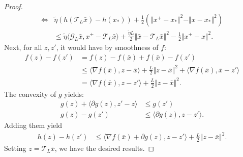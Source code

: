 \documentclass[12pt]{article}
\begin{document}
\begin{proof}
{\begin{align*}
            \iff &
            \tilde \eta (h(\mathcal T_L\bar x) - h(x_*))  
            + 
            \frac{1}{2}\left(
                \Vert x^+ - x_*\Vert^2 - 
                \Vert x - x_*\Vert^2
            \right)
            \\
            & \le 
            \tilde \eta 
            \langle \mathcal G_L\bar x, x^+ - \mathcal T_L \bar x\rangle
            + 
            \frac{\tilde \eta L}{2} \Vert \bar x - \mathcal T_L \bar x\Vert^2
            - 
            \frac{1}{2}\Vert x^+ - x\Vert^2. 
        \end{align*}
        }
        Next, for all $z, z'$, it would have by smoothness of $f$: 
        \begin{align*}
            f(z) - f(z') &= 
            f(z) - f(\bar x) + f(\bar x) - f(z')
            \\
            &\le 
            \langle 
                \nabla f(\bar x), z - \bar x
            \rangle + 
            \frac{L}{2}\Vert z - \bar x\Vert^2 
            + 
            \langle 
                \nabla f(\bar x), 
                \bar x - z'
            \rangle
            \\
            &= 
            \langle \nabla f(\bar x), z - z'\rangle
            + 
            \frac{L}{2}\Vert z - \bar x\Vert^2. 
        \end{align*}
        The convexity of $g$ yields: 
        \begin{align*}
            g(z) + 
            \langle 
                \partial g(z), z' - z
            \rangle 
            &\le g(z')
            \\
            g(z) - g(z') 
            &\le 
            \langle \partial g(z), z - z'\rangle. 
        \end{align*}
        Adding them yield 
        \begin{align*}
            h(z) - h(z') &\le 
            \langle \nabla f(\bar x) + \partial g(z), z - z'\rangle + 
            \frac{L}{2}\Vert z - \bar x\Vert^2. 
        \end{align*}
        Setting $z = \mathcal T_L \bar x$, we have the desired results. 
    \end{proof}
\end{document}
